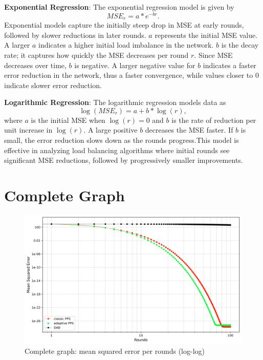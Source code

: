\textbf{Exponential Regression}: The exponential regression model is given by $$MSE_r=a*e^{-br}.$$ Exponential models capture the initially steep drop in MSE at early rounds, followed by slower reductions in later rounds. $a$ represents the initial MSE value. A larger $a$ indicates a higher initial load imbalance in the network. $b$ is the decay rate; it captures how quickly the MSE decreases per round $r$. Since MSE decreases over time, $b$ is negative. A larger negative value for $b$ indicates a faster error reduction in the network, thus a faster convergence, while values closer to 0 indicate slower error reduction.

\textbf{Logarithmic Regression}: The logarithmic regression models data as $$\log{(MSE_r)}=a+b*\log{(r)},$$ where $a$ is the initial MSE when $\log{(r)}=0$ and $b$ is the rate of reduction per unit increase in $\log{(r)}$. A large positive $b$ decreases the MSE faster. If $b$ is small, the error reduction slows down as the rounds progress.This model is effective in analyzing load balancing algorithms where initial rounds see significant MSE reductions, followed by progressively smaller improvements.

\section{Complete Graph}\label{sec:completeGraph}

\begin{figure}[]
    \centering
    \includegraphics[width=\linewidth]{figures/Simulation_outcomes/CompleteGraph/DAB_vs_PPS_CG_r100_n1024_averaged_loglog.png}
    \caption{Complete graph: mean squared error per rounds (log-log)}
    \label{fig:completegraphMSEperRoundLogLog}
\end{figure}

